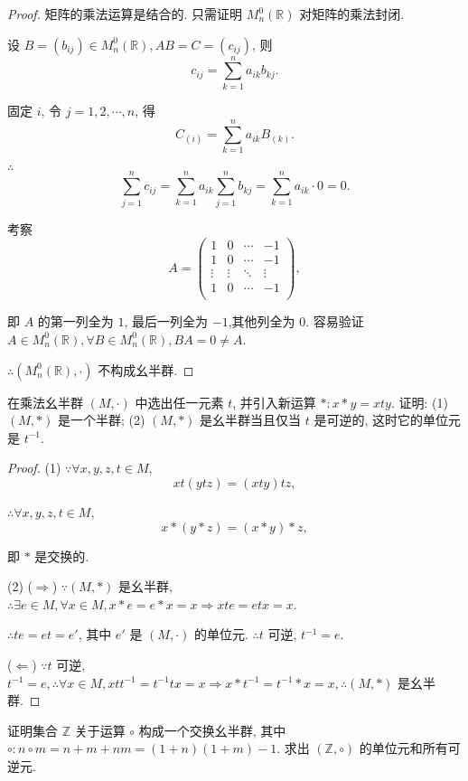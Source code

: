 \documentclass{ctexart}
\begin{document}
\begin{proof}
    矩阵的乘法运算是结合的. 只需证明 $M_n^0(\mathbb{R})$ 对矩阵的乘法封闭.

    设 $B=(b_{ij})\in M_n^0(\mathbb{R}),AB=C=(c_{ij})$, 则
    \[c_{ij}=\sum_{k=1}^na_{ik}b_{kj}.\]

    固定 $i$, 令 $j=1,2,\cdots,n$, 得
    \[C_{(i)}=\sum_{k=1}^na_{ik}B_{(k)}.\]

    $\therefore$
    \[\sum\limits_{j=1}^{n}c_{ij}=\sum_{k=1}^na_{ik}\sum\limits_{j=1}^{n}b_{kj}=\sum_{k=1}^na_{ik}\cdot0=0.\]

    考察
    \[A=\begin{pmatrix}
        1 & 0 & \cdots & -1 \\
        1 & 0 & \cdots & -1 \\
        \vdots & \vdots & \ddots & \vdots \\
        1 & 0 & \cdots & -1 \\
    \end{pmatrix},\]

    即 $A$ 的第一列全为 $1$, 最后一列全为 $-1$,其他列全为 $0$. 容易验证 $A\in M_n^0(\mathbb{R}),\forall B\in M_n^0(\mathbb{R}),BA=0\neq A$.

    $\therefore(M_n^0(\mathbb{R}),\cdot)$ 不构成幺半群.
\end{proof}
\begin{exercise}[1.3]
    在乘法幺半群 $(M,\cdot)$ 中选出任一元素 $t$, 并引入新运算 $*:x*y=xty$. 证明: (1) $(M,*)$ 是一个半群; (2) $(M,*)$ 是幺半群当且仅当 $t$ 是可逆的, 这时它的单位元是 $t^{-1}$.
\end{exercise}
\begin{proof}
    (1) $\because\forall x,y,z,t\in M$,
    \[xt(ytz)=(xty)tz,\]

    $\therefore\forall x,y,z,t\in M$,
    \[x*(y*z)=(x*y)*z,\]

    即 $*$ 是交换的.

    (2) ($\Rightarrow$) $\because(M,*)$ 是幺半群, $\therefore\exists e\in M,\forall x\in M,x*e=e*x=x\Rightarrow xte=etx=x$.

    $\therefore te=et=e'$, 其中 $e'$ 是 $(M,\cdot)$ 的单位元. $\therefore t$ 可逆, $t^{-1}=e$.

    ($\Leftarrow$) $\because t$ 可逆, $t^{-1}=e,\therefore\forall x\in M,xtt^{-1}=t^{-1}tx=x\Rightarrow x*t^{-1}=t^{-1}*x=x,\therefore(M,*)$ 是幺半群.
\end{proof}
\begin{exercise}[1.4]
    证明集合 $\mathbb{Z}$ 关于运算 $\circ$ 构成一个交换幺半群, 其中 $\circ:n\circ m=n+m+nm=(1+n)(1+m)-1$. 求出 $(\mathbb{Z},\circ)$ 的单位元和所有可逆元.
\end{exercise}
\end{document}
